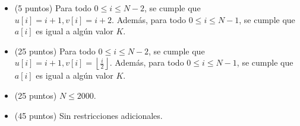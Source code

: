 \documentclass[12pt]{scrartcl}
\begin{document}


    \begin{itemize}
    
        \item (5 puntos) Para todo $0 \le i \le N - 2$, se cumple que $u[i] = i + 1, v[i] = i + 2$. Además, para todo $0 \le i \le N - 1$, se cumple que $a[i]$ es igual a algún valor $K$. 
        \item (25 puntos) Para todo $0 \le i \le N - 2$, se cumple que $u[i] = i + 1, v[i] = \left\lfloor \frac{i}{2} \right\rfloor$. Además, para todo $0 \le i \le N - 1$, se cumple que $a[i]$ es igual a algún valor $K$. 
        \item (25 puntos) $N \le 2000$.
        \item (45 puntos) Sin restricciones adicionales.
    \end{itemize}
\end{document}
